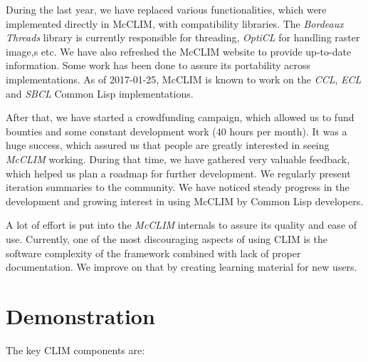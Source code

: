\documentclass{sig-alternate-05-2015}
\begin{document}
During the last year, we have replaced various functionalities, which were
implemented directly in McCLIM, with compatibility libraries.
The \emph{Bordeaux Threads}\cite{BT} library is currently
responsible for threading, \emph{OptiCL}\cite{OptiCL} for handling
raster image,s etc. We have also refreshed the McCLIM website to
provide up-to-date information. Some work has been done to assure its
portability across implementations. As of 2017-01-25, McCLIM is known to
work on the \emph{CCL}\cite{CCL}, \emph{ECL}\cite{ECL} and
\emph{SBCL}\cite{SBCL} Common Lisp implementations.

After that, we have started a crowdfunding campaign, which allowed us
to fund bounties and some constant development work (40 hours per
month). It was a huge success, which assured us that people are greatly
interested in seeing \emph{McCLIM} working. During that time, we have
gathered very valuable feedback, which helped us plan a
roadmap\cite{roadmap} for further development. We regularly present
iteration summaries to the community. We have noticed steady progress
in the development and growing interest in using McCLIM by Common Lisp
developers.

A lot of effort is put into the \emph{McCLIM} internals to assure its
quality and ease of use. Currently, one of the most discouraging aspects of
using CLIM is the software complexity of the framework combined with lack
of proper documentation. We improve on that by creating
learning\cite{guided} material for new users.

\section{Demonstration}

The key CLIM components are:
\end{document}
